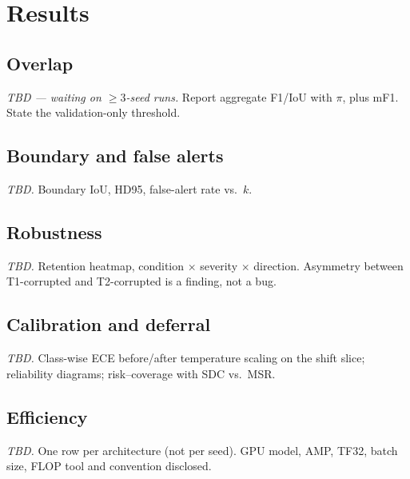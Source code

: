 \section{Results}
\label{sec:results}


\subsection{Overlap}
\emph{TBD --- waiting on $\ge 3$-seed runs.} Report aggregate F1/IoU
with $\pi$, plus mF1. State the validation-only threshold.

\subsection{Boundary and false alerts}
\emph{TBD.} Boundary IoU, HD95, false-alert rate vs.\ $k$.

\subsection{Robustness}
\emph{TBD.} Retention heatmap, condition $\times$ severity $\times$
direction. Asymmetry between T1-corrupted and T2-corrupted is a
finding, not a bug.

\subsection{Calibration and deferral}
\emph{TBD.} Class-wise ECE before/after temperature scaling on the
shift slice; reliability diagrams; risk--coverage with SDC vs.\ MSR.

\subsection{Efficiency}
\emph{TBD.} One row per architecture (not per seed). GPU model, AMP,
TF32, batch size, FLOP tool and convention disclosed.

